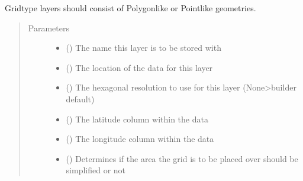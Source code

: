 \documentclass[letterpaper,10pt,english]{sphinxmanual}
\begin{document}
\begin{fulllineitems}
\begin{fulllineitems}
\sphinxAtStartPar
Grid\sphinxhyphen{}type layers should consist of Polygon\sphinxhyphen{}like or Point\sphinxhyphen{}like geometries.
\begin{quote}\begin{description}
\item[{Parameters}] \leavevmode\begin{itemize}
\item {} 
\sphinxAtStartPar
{} () \textendash{} The name this layer is to be stored with

\item {} 
\sphinxAtStartPar
{} (\sphinxstyleliteralemphasis{\sphinxupquote{{[}}}\sphinxstyleliteralemphasis{\sphinxupquote{, }}\sphinxstyleliteralemphasis{\sphinxupquote{, }}\sphinxstyleliteralemphasis{\sphinxupquote{{]}}}) \textendash{} The location of the data for this layer

\item {} 
\sphinxAtStartPar
{} () \textendash{} The hexagonal resolution to use for this layer (None\sphinxhyphen{}\textgreater{}builder default)

\item {} 
\sphinxAtStartPar
{} () \textendash{} The latitude column within the data

\item {} 
\sphinxAtStartPar
{} () \textendash{} The longitude column within the data

\item {} 
\sphinxAtStartPar
{} () \textendash{} Determines if the area the grid is to be placed over should be simplified or not

\end{itemize}

\end{description}\end{quote}


\end{fulllineitems}
\end{fulllineitems}
\end{document}
